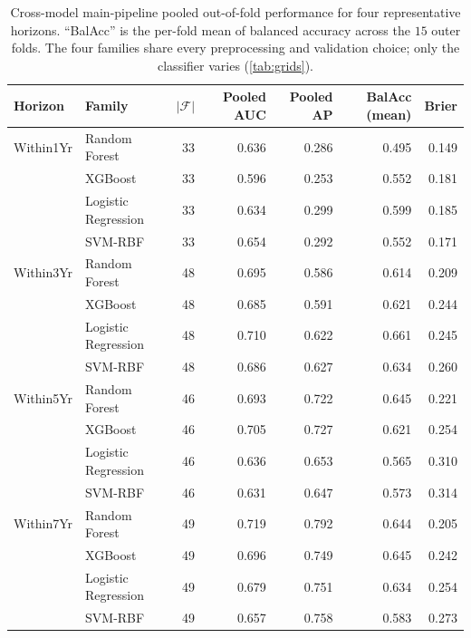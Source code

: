 \documentclass[11pt,a4paper]{article}
\providecommand{\Cref}[1]{\autoref{#1}}
\begin{document}
\begin{table}[h]
\centering
\caption{Cross-model main-pipeline pooled out-of-fold performance for
four representative horizons. ``BalAcc'' is the per-fold mean of
balanced accuracy across the $15$ outer folds. The four families share
every preprocessing and validation choice; only the classifier varies
(\Cref{tab:grids}).}
\label{tab:cross_model_main}
\small
\begin{tabular}{llrrrrr}
\toprule
Horizon & Family & $|\mathcal{F}|$ & Pooled AUC & Pooled AP & BalAcc (mean) & Brier \\
\midrule
Within1Yr & Random Forest       & 33 & 0.636 & 0.286 & 0.495 & 0.149 \\
          & XGBoost             & 33 & 0.596 & 0.253 & 0.552 & 0.181 \\
          & Logistic Regression & 33 & 0.634 & 0.299 & 0.599 & 0.185 \\
          & SVM-RBF             & 33 & 0.654 & 0.292 & 0.552 & 0.171 \\
\midrule
Within3Yr & Random Forest       & 48 & 0.695 & 0.586 & 0.614 & 0.209 \\
          & XGBoost             & 48 & 0.685 & 0.591 & 0.621 & 0.244 \\
          & Logistic Regression & 48 & 0.710 & 0.622 & 0.661 & 0.245 \\
          & SVM-RBF             & 48 & 0.686 & 0.627 & 0.634 & 0.260 \\
\midrule
Within5Yr & Random Forest       & 46 & 0.693 & 0.722 & 0.645 & 0.221 \\
          & XGBoost             & 46 & 0.705 & 0.727 & 0.621 & 0.254 \\
          & Logistic Regression & 46 & 0.636 & 0.653 & 0.565 & 0.310 \\
          & SVM-RBF             & 46 & 0.631 & 0.647 & 0.573 & 0.314 \\
\midrule
Within7Yr & Random Forest       & 49 & 0.719 & 0.792 & 0.644 & 0.205 \\
          & XGBoost             & 49 & 0.696 & 0.749 & 0.645 & 0.242 \\
          & Logistic Regression & 49 & 0.679 & 0.751 & 0.634 & 0.254 \\
          & SVM-RBF             & 49 & 0.657 & 0.758 & 0.583 & 0.273 \\
\bottomrule
\end{tabular}
\end{table}
\end{document}
